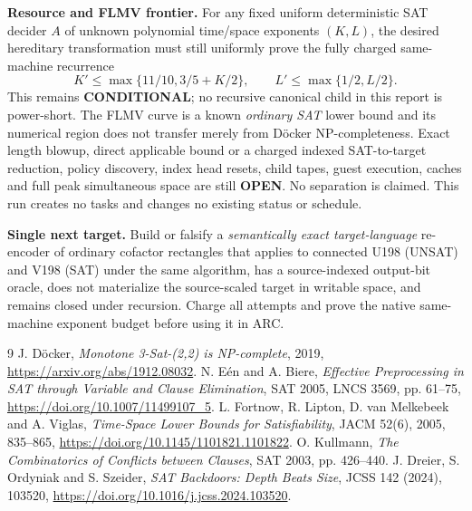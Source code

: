 \documentclass[10pt]{article}
\begin{document}
\noindent\textbf{Resource and FLMV frontier.} For any fixed uniform deterministic SAT decider $A$ of unknown polynomial time/space exponents $(K,L)$, the desired hereditary transformation must still uniformly prove the fully charged same-machine recurrence
\[
 K'\le\max\{11/10,3/5+K/2\},\qquad
 L'\le\max\{1/2,L/2\}.\tag{5}
\]
This remains \textbf{CONDITIONAL}; no recursive canonical child in this report is power-short. The FLMV curve is a known \emph{ordinary SAT} lower bound and its numerical region does not transfer merely from D\"ocker NP-completeness. Exact length blowup, direct applicable bound or a charged indexed SAT-to-target reduction, policy discovery, index head resets, child tapes, guest execution, caches and full peak simultaneous space are still \textbf{OPEN}. No separation is claimed. This run creates no tasks and changes no existing status or schedule.

\noindent\textbf{Single next target.} Build or falsify a \emph{semantically exact target-language} re-encoder of ordinary cofactor rectangles that applies to connected U198 (UNSAT) and V198 (SAT) under the same algorithm, has a source-indexed output-bit oracle, does not materialize the source-scaled target in writable space, and remains closed under recursion. Charge all attempts and prove the native same-machine exponent budget before using it in ARC.

\begin{thebibliography}{9}
 J. D\"ocker, \emph{Monotone 3-Sat-(2,2) is NP-complete}, 2019, \url{https://arxiv.org/abs/1912.08032}.
 N. E\'en and A. Biere, \emph{Effective Preprocessing in SAT through Variable and Clause Elimination}, SAT 2005, LNCS 3569, pp. 61--75, \url{https://doi.org/10.1007/11499107_5}.
 L. Fortnow, R. Lipton, D. van Melkebeek and A. Viglas, \emph{Time-Space Lower Bounds for Satisfiability}, JACM 52(6), 2005, 835--865, \url{https://doi.org/10.1145/1101821.1101822}.
 O. Kullmann, \emph{The Combinatorics of Conflicts between Clauses}, SAT 2003, pp. 426--440.
 J. Dreier, S. Ordyniak and S. Szeider, \emph{SAT Backdoors: Depth Beats Size}, JCSS 142 (2024), 103520, \url{https://doi.org/10.1016/j.jcss.2024.103520}.
\end{thebibliography}
\end{document}
